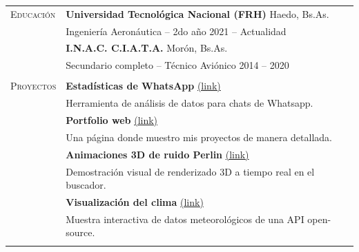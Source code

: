 \documentclass[12pt]{article}
\begin{document}
   \vspace{0.5\baselineskip}\noindent
   \renewcommand{\arraystretch}{1}%
   \begin{tabular}[t]{@{}p{1.15in} @{}p{5.35in}}
   
   {\scshape Educación}
   &
   \textbf{Universidad Tecnológica Nacional (FRH)}  \hfill Haedo, Bs.As.\vspace{0.015in} \\ &
   Ingeniería Aeronáutica -- 2do año \hfill 2021 -- Actualidad\vspace{0.015in}
   \vspace{0.7\baselineskip}
   \\
   & \textbf{I.N.A.C. C.I.A.T.A.}  \hfill Morón, Bs.As.\vspace{0.015in} \\ &
   Secundario completo -- Técnico Aviónico \hfill 2014 -- 2020\vspace{0.015in}
   \\
   &
   \vspace{.3\baselineskip}
   {\noindent\hspace{-50mm}\hrulefill}
   \vspace{.7\baselineskip}
   \\
      
   

   {\scshape Proyectos}
   &
   \textbf{Estadísticas de WhatsApp} \href{https://damiponce.github.io/chat-analyser/}{\small(link)}
   \\
   &
   Herramienta de análisis de datos para chats de Whatsapp.
   \vspace{0.7\baselineskip}
   \\
   & \textbf{Portfolio web} \href{https://damiponce.github.io/}{\small(link)}
   \\
   & Una página donde muestro mis proyectos de manera detallada.
   \vspace{0.7\baselineskip}
   \\
   & \textbf{Animaciones 3D de ruido Perlin} \href{https://damiponce.github.io/3d-noise/}{\small(link)}
   \\
   & Demostración visual de renderizado 3D a tiempo real en el buscador.
   \vspace{0.7\baselineskip}
   \\
   & \textbf{Visualización del clima} \href{https://damiponce.github.io/weather-web/}{\small(link)}
   \\
   & Muestra interactiva de datos meteorológicos de una API open-source.
   \\
   &
   \vspace{.3\baselineskip}
   {\noindent\hspace{-50mm}\hrulefill}
   \vspace{.7\baselineskip}
   \\


\end{tabular}
\end{document}

